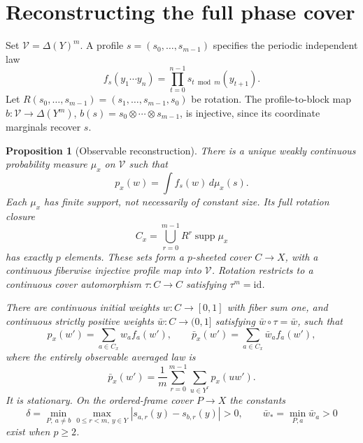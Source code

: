 \documentclass[11pt]{article}
\newtheorem{proposition}[theorem]{Proposition}
\theoremstyle{remark}\newtheorem{remark}[theorem]{Remark}
\newcommand{\supp}{\operatorname{supp}}\newcommand{\St}{\operatorname{St}}
\begin{document}
\section{Reconstructing the full phase cover}
Set $\mathcal V=\Delta(Y)^m$. A profile $s=(s_0,\ldots,s_{m-1})$ specifies the periodic independent law
\[
f_s(y_1\cdots y_n)=\prod_{t=0}^{n-1}s_{t\bmod m}(y_{t+1}).
\]
Let $R(s_0,\ldots,s_{m-1})=(s_1,\ldots,s_{m-1},s_0)$ be rotation. The profile-to-block map $b:\mathcal V\to\Delta(Y^m)$, $b(s)=s_0\otimes\cdots\otimes s_{m-1}$, is injective, since its coordinate marginals recover $s$.

\begin{proposition}[Observable reconstruction]\label{prop:reconstruct}
There is a unique weakly continuous probability measure $\mu_x$ on $\mathcal V$ such that
\[
p_x(w)=\int f_s(w)\,d\mu_x(s).
\]
Each $\mu_x$ has finite support, not necessarily of constant size. Its full rotation closure
\[
C_x=\bigcup_{r=0}^{m-1}R^r\supp\mu_x
\]
has exactly $p$ elements. These sets form a $p$-sheeted cover $C\to X$, with a continuous fiberwise injective profile map into $\mathcal V$. Rotation restricts to a continuous cover automorphism $\tau:C\to C$ satisfying $\tau^m=\mathrm{id}$.

There are continuous initial weights $w:C\to[0,1]$ with fiber sum one, and continuous strictly positive weights $\bar w:C\to(0,1]$ satisfying $\bar w\circ\tau=\bar w$, such that
\[
p_x(w')=\sum_{a\in C_x}w_a f_a(w'),\qquad
\bar p_x(w')=\sum_{a\in C_x}\bar w_a f_a(w'),
\]
where the entirely observable averaged law is
\begin{equation}\label{eq:stationarize}
\bar p_x(w')=\frac1m\sum_{r=0}^{m-1}\sum_{u\in Y^r}p_x(uw').
\end{equation}
It is stationary. On the ordered-frame cover $P\to X$ the constants
\[
\delta=\min_{P,\ a\ne b}\max_{0\leq r<m,\ y\in Y}|s_{a,r}(y)-s_{b,r}(y)|>0,
\qquad \bar w_*=\min_{P,a}\bar w_a>0
\]
exist when $p\geq2$.
\end{proposition}
\end{document}
